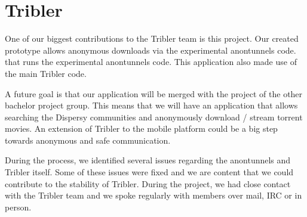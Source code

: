 \section{Tribler}
	One of our biggest contributions to the Tribler team is this project. Our created prototype allows anonymous downloads via the experimental anontunnels code. that runs the experimental anontunnels code. This application also made use of the main Tribler code.
	
	A future goal is that our application will be merged with the project of the other bachelor project group. This means that we will have an application that allows searching the Dispersy communities and anonymously download / stream torrent movies. An extension of Tribler to the mobile platform could be a big step towards anonymous and safe communication.
	
	During the process, we identified several issues regarding the anontunnels and Tribler itself. Some of these issues were fixed and we are content that we could contribute to the stability of Tribler. During the project, we had close contact with the Tribler team and we spoke regularly with members over mail, IRC or in person.